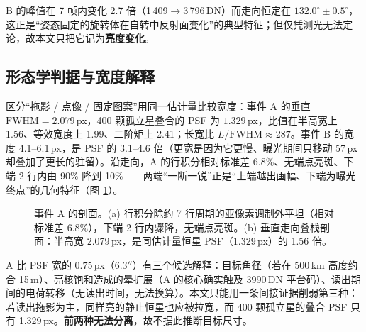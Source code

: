 \documentclass[11pt,a4paper]{ctexart}
\begin{document}
B 的峰值在 7 帧内变化 2.7 倍（1\,409$\to$3\,796\,DN）而走向恒定在 $132.0^\circ\pm0.5^\circ$，这正是“姿态固定的旋转体在自转中反射面变化”的典型特征；但仅凭测光无法定论，故本文只把它记为\textbf{亮度变化}。

\subsection{形态学判据与宽度解释}\label{sec:morph}
区分“拖影 / 点像 / 固定图案”用同一估计量比较宽度：事件 A 的垂直 $\mathrm{FWHM}=2.079$\,px，400 颗孤立星叠合的 PSF 为 $1.329$\,px，比值在半高宽上 1.56、等效宽度上 1.99、二阶矩上 2.41；长宽比 $L/\mathrm{FWHM}\approx287$。事件 B 的宽度 4.1--6.1\,px，是 PSF 的 3.1--4.6 倍（更宽是因为它更慢、曝光期间只移动 57\,px 却叠加了更长的驻留）。沿走向，A 的行积分相对标准差 6.8\%、无端点亮斑、下端 2 行内由 90\% 降到 10\%——两端“一断一锐”正是“上端越出画幅、下端为曝光终点”的几何特征（图 \ref{fig:profiles}）。

\begin{figure}[htbp]\centering
{}\hfill
{}
\caption{事件 A 的剖面。(a) 行积分除约 7 行周期的亚像素调制外平坦（相对标准差 6.8\%），下端 2 行内骤降，无端点亮斑。(b) 垂直走向叠栈剖面：半高宽 2.079\,px，是同估计量恒星 PSF（1.329\,px）的 1.56 倍。}
\label{fig:profiles}
\end{figure}

A 比 PSF 宽的 $0.75$\,px（$6.3''$）有三个候选解释：目标角径（若在 500\,km 高度约合 15\,m）、亮核饱和造成的晕扩展（A 的核心确实触及 3990\,DN 平台码）、读出期间的电荷转移（无读出时间，无法换算）。本文只能用一条间接证据削弱第三种：若读出拖影为主，同样亮的静止恒星也应被拉宽，而 400 颗孤立星的叠合 PSF 只有 1.329\,px。\textbf{前两种无法分离}，故不据此推断目标尺寸。
\end{document}
